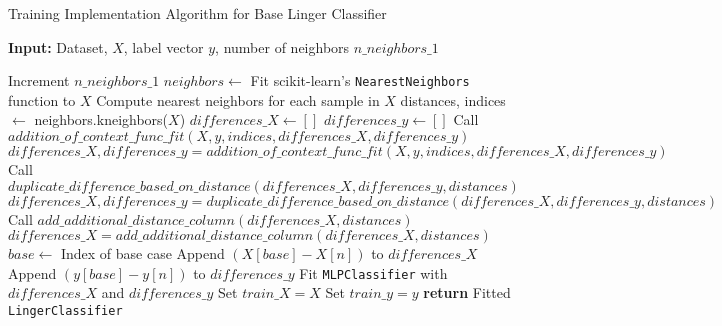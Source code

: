 \documentclass[a4paper, 12pt]{report}
\begin{document}
\begin{algorithm}[H]
    \caption{Training Implementation Algorithm for Base Linger Classifier}
    \textbf{Input:} Dataset, $X$, label vector $y$, number of neighbors $n\_neighbors\_1$
    \label{alg:base_linger_classifier_train_implementation}
    \begin{algorithmic}[1]
            \State Increment $n\_neighbors\_1$
            \State $neighbors \gets$ Fit scikit-learn's \texttt{NearestNeighbors} function to $X$
            \State Compute nearest neighbors for each sample in $X$
            \State distances, indices $\gets$ neighbors.kneighbors($X$)
            \State $differences\_X \gets []$
            \State $differences\_y \gets []$
                \State Call $addition\_of\_context\_func\_fit(X, y, indices, differences\_X, differences\_y)$
                \State $differences\_X, differences\_y = addition\_of\_context\_func\_fit(X, y, indices, differences\_X, differences\_y)$
                \State Call $duplicate\_difference\_based\_on\_distance(differences\_X, differences\_y, distances)$
                \State $differences\_X, differences\_y = duplicate\_difference\_based\_on\_distance(differences\_X, differences\_y, distances)$
                \State Call $add\_additional\_distance\_column(differences\_X, distances)$
                \State $differences\_X = add\_additional\_distance\_column(differences\_X, distances)$
            \Else
                    \State $base \gets$ Index of base case
                        \State Append $(X[base] - X[n])$ to $differences\_X$
                        \State Append $(y[base] - y[n])$ to $differences\_y$
                    \EndFor
                \EndFor  
            \EndIf
            \State Fit \texttt{MLPClassifier} with $differences\_X$ and $differences\_y$
            \State Set $train\_X = X$
            \State Set $train\_y = y$
            \State \textbf{return} Fitted \texttt{LingerClassifier}
        \EndFunction
    \end{algorithmic}
\end{algorithm}
\end{document}
